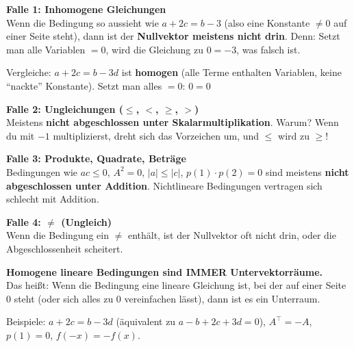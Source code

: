 \documentclass[a4paper,12pt]{article}
\begin{document}
\begin{merkbox}[title={Rote Flaggen -- KEIN Unterraum}]
\textbf{Falle 1: Inhomogene Gleichungen}\\
Wenn die Bedingung so aussieht wie $a + 2c = b - 3$ (also eine Konstante $\neq 0$ auf einer Seite steht), dann ist der \textbf{Nullvektor meistens nicht drin}. Denn: Setzt man alle Variablen $= 0$, wird die Gleichung zu $0 = -3$, was falsch ist.

\medskip
Vergleiche: $a + 2c = b - 3d$ ist \textbf{homogen} (alle Terme enthalten Variablen, keine ``nackte'' Konstante). Setzt man alles $= 0$: $0 = 0$ \checkmark

\bigskip
\textbf{Falle 2: Ungleichungen ($\leq$, $<$, $\geq$, $>$)}\\
Meistens \textbf{nicht abgeschlossen unter Skalarmultiplikation}. Warum? Wenn du mit $-1$ multiplizierst, dreht sich das Vorzeichen um, und $\leq$ wird zu $\geq$!

\bigskip
\textbf{Falle 3: Produkte, Quadrate, Betr\"age}\\
Bedingungen wie $ac \leq 0$, $A^2 = 0$, $|a| \leq |c|$, $p(1) \cdot p(2) = 0$ sind meistens \textbf{nicht abgeschlossen unter Addition}. Nichtlineare Bedingungen vertragen sich schlecht mit Addition.

\bigskip
\textbf{Falle 4: $\neq$ (Ungleich)}\\
Wenn die Bedingung ein $\neq$ enth\"alt, ist der Nullvektor oft nicht drin, oder die Abgeschlossenheit scheitert.
\end{merkbox}

\begin{merkbox}[title={Gr\"une Flagge -- JA, Unterraum!}]
\textbf{Homogene lineare Bedingungen sind IMMER Untervektorr\"aume.}\\
Das hei\ss t: Wenn die Bedingung eine lineare Gleichung ist, bei der auf einer Seite $0$ steht (oder sich alles zu $0$ vereinfachen l\"asst), dann ist es ein Unterraum.

\medskip
Beispiele: $a + 2c = b - 3d$ (\"aquivalent zu $a - b + 2c + 3d = 0$), $A^\top = -A$, $p(1) = 0$, $f(-x) = -f(x)$.
\end{merkbox}
\end{document}

